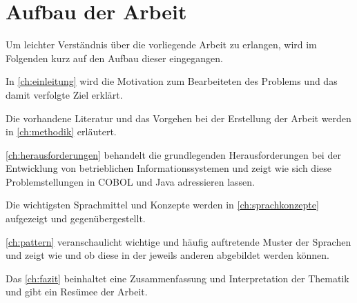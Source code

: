 \section{Aufbau der Arbeit}
Um leichter Verständnis über die vorliegende Arbeit zu erlangen, wird im Folgenden kurz auf den Aufbau dieser eingegangen.

In \autoref{ch:einleitung} wird die Motivation zum Bearbeiteten des Problems und das damit verfolgte Ziel erklärt. 

Die vorhandene Literatur und das Vorgehen bei der Erstellung der Arbeit werden in \autoref{ch:methodik} erläutert.

\autoref{ch:herausforderungen} behandelt die grundlegenden Herausforderungen bei der Entwicklung von betrieblichen Informationssystemen und zeigt wie sich diese Problemstellungen in COBOL und Java adressieren lassen.    

Die wichtigsten Sprachmittel und Konzepte werden in \autoref{ch:sprachkonzepte} aufgezeigt und gegenübergestellt.

\autoref{ch:pattern} veranschaulicht wichtige und häufig auftretende Muster der Sprachen und zeigt wie und ob diese in der jeweils anderen abgebildet werden können.

Das \autoref{ch:fazit} beinhaltet eine Zusammenfassung und Interpretation der Thematik und gibt ein Re­sü­mee der Arbeit.